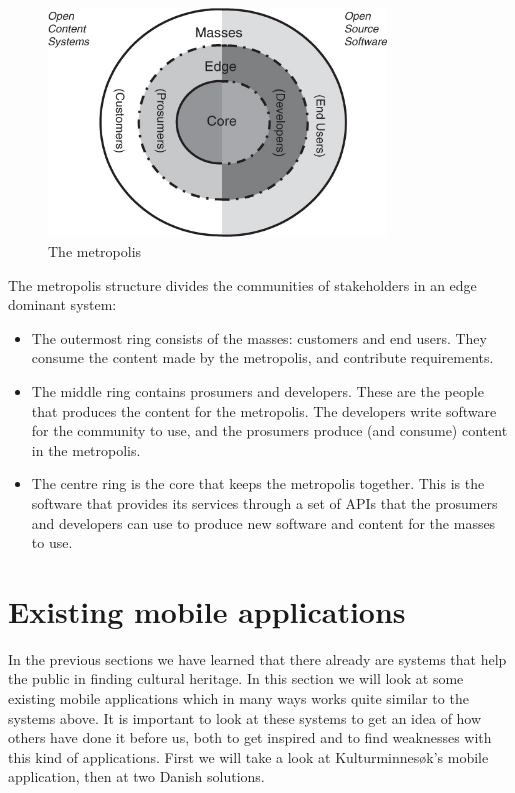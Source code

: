 \documentclass[11pt]{book}
\begin{document}
\begin{figure}[H]
      \centering
      \includegraphics[width=0.8\textwidth]{Figures/Prestudy/metropolis.jpg}
      \caption{The metropolis}
      \label{fig:pre_edgeMetropolis}
\end{figure}

The metropolis structure divides the communities of stakeholders in an edge dominant system:

\begin{itemize}
  \item The outermost ring consists of the masses: customers and end users. They consume the content made by the metropolis, and contribute requirements.
  \item The middle ring contains prosumers and developers. These are the people that produces the content for the metropolis. The developers write software for the community to use, and the prosumers produce (and consume) content in the metropolis.
  \item The centre ring is the core that keeps the metropolis together. This is the software that provides its services through a set of APIs that the prosumers and developers can use to produce new software and content for the masses to use.
\end{itemize}

\section{Existing mobile applications}\label{sec:prestudy_existing_apps}
In the previous sections we have learned that there already are systems that help the public in finding cultural heritage. In this section we will look at some existing mobile applications which in many ways works quite similar to the systems above. It is important to look at these systems to get an idea of how others have done it before us, both to get inspired and to find weaknesses with this kind of applications. First we will take a look at Kulturminnesøk's mobile application, then at two Danish solutions.
\end{document}
